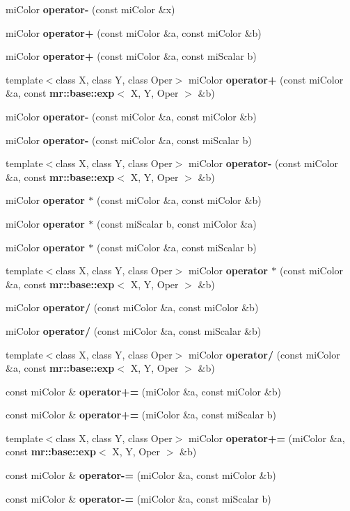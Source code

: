 \begin{CompactItemize}
\item 
mi\-Color {\bf operator-} (const mi\-Color \&x)
\item 
mi\-Color {\bf operator+} (const mi\-Color \&a, const mi\-Color \&b)
\item 
mi\-Color {\bf operator+} (const mi\-Color \&a, const mi\-Scalar b)
\item 
template$<$class X, class Y, class Oper$>$ mi\-Color {\bf operator+} (const mi\-Color \&a, const {\bf mr::base::exp}$<$ X, Y, Oper $>$ \&b)
\item 
mi\-Color {\bf operator-} (const mi\-Color \&a, const mi\-Color \&b)
\item 
mi\-Color {\bf operator-} (const mi\-Color \&a, const mi\-Scalar b)
\item 
template$<$class X, class Y, class Oper$>$ mi\-Color {\bf operator-} (const mi\-Color \&a, const {\bf mr::base::exp}$<$ X, Y, Oper $>$ \&b)
\item 
mi\-Color {\bf operator $\ast$} (const mi\-Color \&a, const mi\-Color \&b)
\item 
mi\-Color {\bf operator $\ast$} (const mi\-Scalar b, const mi\-Color \&a)
\item 
mi\-Color {\bf operator $\ast$} (const mi\-Color \&a, const mi\-Scalar b)
\item 
template$<$class X, class Y, class Oper$>$ mi\-Color {\bf operator $\ast$} (const mi\-Color \&a, const {\bf mr::base::exp}$<$ X, Y, Oper $>$ \&b)
\item 
mi\-Color {\bf operator/} (const mi\-Color \&a, const mi\-Color \&b)
\item 
mi\-Color {\bf operator/} (const mi\-Color \&a, const mi\-Scalar \&b)
\item 
template$<$class X, class Y, class Oper$>$ mi\-Color {\bf operator/} (const mi\-Color \&a, const {\bf mr::base::exp}$<$ X, Y, Oper $>$ \&b)
\item 
const mi\-Color \& {\bf operator+=} (mi\-Color \&a, const mi\-Color \&b)
\item 
const mi\-Color \& {\bf operator+=} (mi\-Color \&a, const mi\-Scalar b)
\item 
template$<$class X, class Y, class Oper$>$ mi\-Color {\bf operator+=} (mi\-Color \&a, const {\bf mr::base::exp}$<$ X, Y, Oper $>$ \&b)
\item 
const mi\-Color \& {\bf operator-=} (mi\-Color \&a, const mi\-Color \&b)
\item 
const mi\-Color \& {\bf operator-=} (mi\-Color \&a, const mi\-Scalar b)

\end{CompactItemize}
